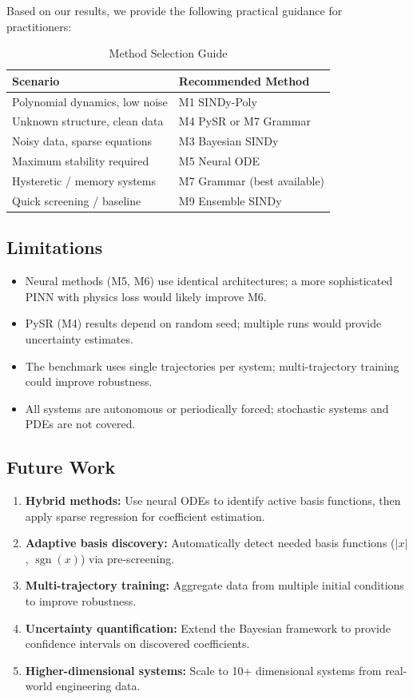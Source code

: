 \documentclass[conference]{IEEEtran}
\begin{document}
Based on our results, we provide the following practical guidance for practitioners:

\begin{table}[!ht]
\centering
\caption{Method Selection Guide}
\label{tab:recommendations}
\begin{tabular}{@{}ll@{}}
\toprule
\textbf{Scenario} & \textbf{Recommended Method} \\
\midrule
Polynomial dynamics, low noise & M1 SINDy-Poly \\
Unknown structure, clean data & M4 PySR or M7 Grammar \\
Noisy data, sparse equations & M3 Bayesian SINDy \\
Maximum stability required & M5 Neural ODE \\
Hysteretic / memory systems & M7 Grammar (best available) \\
Quick screening / baseline & M9 Ensemble SINDy \\
\bottomrule
\end{tabular}
\end{table}

\subsection{Limitations}
\begin{itemize}
    \item Neural methods (M5, M6) use identical architectures; a more sophisticated PINN with physics loss would likely improve M6.
    \item PySR (M4) results depend on random seed; multiple runs would provide uncertainty estimates.
    \item The benchmark uses single trajectories per system; multi-trajectory training could improve robustness.
    \item All systems are autonomous or periodically forced; stochastic systems and PDEs are not covered.
\end{itemize}

\subsection{Future Work}
\begin{enumerate}
    \item \textbf{Hybrid methods:} Use neural ODEs to identify active basis functions, then apply sparse regression for coefficient estimation.
    \item \textbf{Adaptive basis discovery:} Automatically detect needed basis functions ($|x|$, $\operatorname{sgn}(x)$) via pre-screening.
    \item \textbf{Multi-trajectory training:} Aggregate data from multiple initial conditions to improve robustness.
    \item \textbf{Uncertainty quantification:} Extend the Bayesian framework to provide confidence intervals on discovered coefficients.
    \item \textbf{Higher-dimensional systems:} Scale to 10+ dimensional systems from real-world engineering data.
\end{enumerate}
\end{document}
